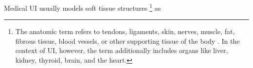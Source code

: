 Medical \ac{UI} usually models
soft tissue structures%
\footnote{
  The anatomic term  refers to
  tendons, ligaments, skin, nerves,
  muscle, fat, fibrous tissue, blood vessels, or
  other supporting tissue of
  the body
  \cite[]{website:NCIDictionary2017}.
  In the context of \ac{UI}, however,
  the term additionally includes
  organs like
  liver, kidney, thyroid, brain, and
  the heart.
} as
